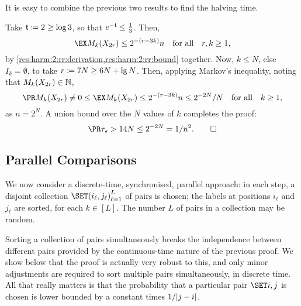 \documentclass{article}
\begin{document}
%

It is easy to combine the previous two results to find the halving time.


\begin{Proof}
Take $\mathfrak{t} \coloneqq 2 \ge \log 3$, so that $e^{-\mathfrak{t}} \le \tfrac13$.
Then,
\[
	\ex{ M_k(X_{2r}) }
\le
	2^{-(r - 3k)} n
\Qforall
	r,k \ge 1,
\]
by \cref{res:harm:2:rr:derivation,res:harm:2:rr:bound} together.
Now, $k \le N$, else $I_k = \emptyset$, to take $r \coloneqq 7 N \ge 6 N + \lg N$.
Then, applying Markov's inequality,
noting that $M_k(X_{2r}) \in \mathbb{N}$,
\[
	\pr{ M_k(X_{2r}) \ne 0 }
\le
	\ex{ M_k(X_{2r}) }
\le
	2^{-(r-3k)} n
\le
	2^{-2N} / N
\Qforall
	k \ge 1,
\]
as $n = 2^N$.
A union bound over the $N$ values of $k$ completes the proof:
\[
	\pr{ \tau_\star > 14 N }
\le
	2^{-2N}
=
	1/n^2.
\qedhere
\]
\end{Proof}


\subsection{Parallel Comparisons}
\label{sec:harm:par}

We now consider a discrete-time, synchronised, parallel approach:
	in each step, a disjoint collection $\set{(i_\ell, j_\ell)}_{\ell=1}^L$ of pairs is chosen;
	the labels at positions $i_\ell$ and $j_\ell$ are sorted, for each $k \in [L]$.
The number $L$ of pairs in a collection may be random.

Sorting a collection of pairs simultaneously breaks the independence between different pairs provided by the continuous-time nature of the previous proof.
We show below that the proof is actually very robust to this, and only minor adjustments are required to sort multiple pairs simultaneously, in discrete time.
All that really matters is that the probability that a particular pair $\set{i,j}$ is chosen is lower bounded by a constant times $1/| j - i |$.
\end{document}
